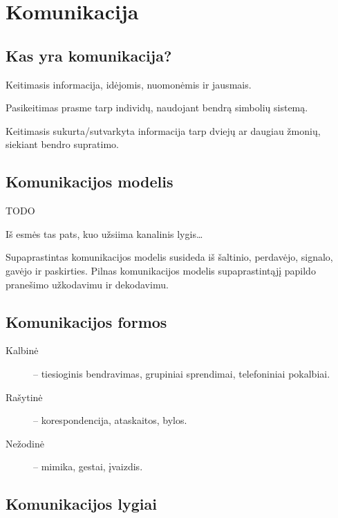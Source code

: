 \chapter{Komunikacija}

\section{Kas yra komunikacija?}

\begin{defn}[Komunikacija]
  Keitimasis informacija, idėjomis, nuomonėmis ir jausmais.
\end{defn}

\begin{defn}[Komunikacija]
  Pasikeitimas prasme tarp individų, naudojant bendrą simbolių sistemą.
\end{defn}

\begin{defn}[Komunikacija]
  Keitimasis sukurta/sutvarkyta informacija tarp dviejų ar daugiau
  žmonių, siekiant bendro supratimo.
\end{defn}

\section{Komunikacijos modelis}

TODO

Iš esmės tas pats, kuo užsiima kanalinis lygis…

Supaprastintas komunikacijos modelis susideda iš šaltinio, perdavėjo,
signalo, gavėjo ir paskirties. Pilnas komunikacijos modelis
supaprastintąjį papildo pranešimo užkodavimu ir dekodavimu.

\section{Komunikacijos formos}

\begin{description}
  \item[Kalbinė] – tiesioginis bendravimas, grupiniai sprendimai,
    telefoniniai pokalbiai.
  \item[Rašytinė] – korespondencija, ataskaitos, bylos.
  \item[Nežodinė] – mimika, gestai, įvaizdis.
\end{description}

\section{Komunikacijos lygiai}

